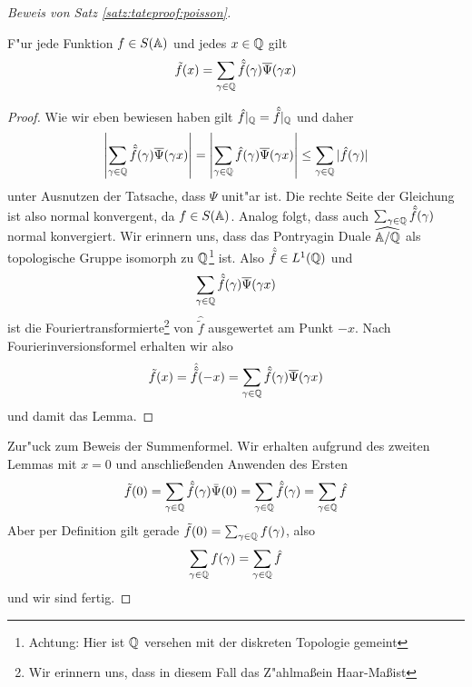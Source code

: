 \begin{proof}[Beweis von Satz \ref{satz:tateproof:poisson}]
		\begin{lemma}
			F"ur jede Funktion $f \in S(\mathbb{A})$ und jedes $x\in \mathbb{Q}$ gilt
			\begin{align*}
				\tilde{f}(x) = \sum_{\gamma \in \mathbb{Q}} {\hat{\tilde{f}}(\gamma)\overline{\Psi}(\gamma x)}
			\end{align*}
		\end{lemma}
		\begin{proof}
			Wie wir eben bewiesen haben gilt $\hat{f}|_{\mathbb{Q}} = \hat{\tilde{f}}|_{\mathbb{Q}}$ und daher
			\begin{align*}
				\left| \sum_{\gamma \in \mathbb{Q}} {\hat{\tilde{f}}(\gamma)\overline{\Psi}(\gamma x)}\right| = 
				\left| \sum_{\gamma \in \mathbb{Q}} {\hat{f}(\gamma)\overline{\Psi}(\gamma x)}\right| 
				\leq \sum_{\gamma \in \mathbb{Q}} {|\hat{f}(\gamma)|}
			\end{align*}
			unter Ausnutzen der Tatsache, dass $\Psi$ unit"ar ist. Die rechte Seite der Gleichung ist also normal konvergent, da $f \in S(\mathbb{A})$. Analog folgt, dass auch $\sum_{\gamma \in \mathbb{Q}} {\hat{\tilde{f}}(\gamma)}$ normal konvergiert. 
			Wir erinnern uns, dass das Pontryagin Duale $\widehat{\mathbb{A}/\mathbb{Q}}$ als topologische Gruppe isomorph zu $\mathbb{Q}$\footnote{Achtung: Hier ist $\mathbb{Q}$ versehen mit der diskreten Topologie gemeint} ist. 
			Also $\hat{\tilde{f}} \in L^1(\mathbb{Q})$ und
			\begin{align*}
				\sum_{\gamma \in \mathbb{Q}} {\hat{\tilde{f}}(\gamma)\overline{\Psi}(\gamma x)}
			\end{align*}
			ist die Fouriertransformierte\footnote{Wir erinnern uns, dass in diesem Fall das Z"ahlma\ss ein Haar-Ma\ss ist} von $\hat{\tilde{f}}$ ausgewertet am Punkt $-x$. Nach Fourierinversionsformel erhalten wir also
			\begin{align*}
				\tilde{f}(x) = \hat{\hat{\tilde{f}}}(-x) = \sum_{\gamma \in \mathbb{Q}} {\hat{\tilde{f}}(\gamma)\overline{\Psi}(\gamma x)}
			\end{align*}
			und damit das Lemma.
		\end{proof}
		Zur"uck zum Beweis der Summenformel. Wir erhalten aufgrund des zweiten Lemmas mit $x=0$ und anschlie\ss enden Anwenden des Ersten
		\begin{align*}
			\tilde{f}(0) = 	\sum_{\gamma \in \mathbb{Q}} \hat{\tilde{f}}(\gamma) \bar{\Psi}(0) =
							\sum_{\gamma \in \mathbb{Q}} \hat{\tilde{f}}(\gamma) =
							\sum_{\gamma \in \mathbb{Q}} \hat{f}
		\end{align*}
		Aber per Definition gilt gerade $\tilde{f}(0) = \sum_{\gamma \in \mathbb{Q}}f(\gamma)$, also
		\begin{align*}
			\sum_{\gamma \in \mathbb{Q}}f(\gamma) = \sum_{\gamma \in \mathbb{Q}} \hat{f}
		\end{align*}
		und wir sind fertig.
	\end{proof}